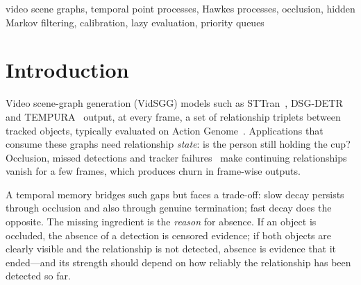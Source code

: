 \documentclass[conference]{IEEEtran}
\begin{document}
\begin{IEEEkeywords}
video scene graphs, temporal point processes, Hawkes processes, occlusion, hidden
Markov filtering, calibration, lazy evaluation, priority queues
\end{IEEEkeywords}

\section{Introduction}
Video scene-graph generation (VidSGG) models such as STTran~\cite{cong2021sttran},
DSG-DETR~\cite{feng2023dsgdetr} and TEMPURA~\cite{nag2023tempura} output, at every
frame, a set of relationship triplets between tracked objects, typically evaluated on
Action Genome~\cite{ji2020ag}. Applications that consume these graphs need
relationship \emph{state}: is the person still holding the cup? Occlusion, missed
detections and tracker failures~\cite{zhang2022bytetrack} make continuing
relationships vanish for a few frames, which produces churn in frame-wise outputs.

A temporal memory bridges such gaps but faces a trade-off: slow decay persists through
occlusion and also through genuine termination; fast decay does the opposite. The
missing ingredient is the \emph{reason} for absence. If an object is occluded, the
absence of a detection is censored evidence; if both objects are clearly visible and
the relationship is not detected, absence is evidence that it ended---and its strength
should depend on how reliably the relationship has been detected so far.
\end{document}
